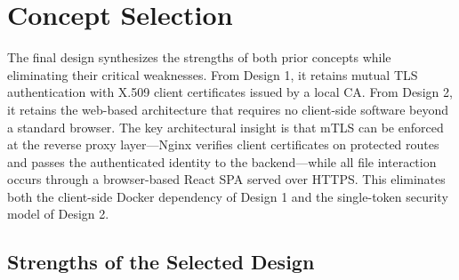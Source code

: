 \documentclass[12pt,letterpaper]{report}
\begin{document}
\chapter{Concept Selection}

The final design synthesizes the strengths of both prior concepts while eliminating their critical weaknesses. From Design 1, it retains mutual TLS authentication with X.509 client certificates issued by a local CA. From Design 2, it retains the web-based architecture that requires no client-side software beyond a standard browser. The key architectural insight is that mTLS can be enforced at the reverse proxy layer---Nginx verifies client certificates on protected routes and passes the authenticated identity to the backend---while all file interaction occurs through a browser-based React SPA served over HTTPS. This eliminates both the client-side Docker dependency of Design 1 and the single-token security model of Design 2.

\section{Strengths of the Selected Design}
\end{document}
